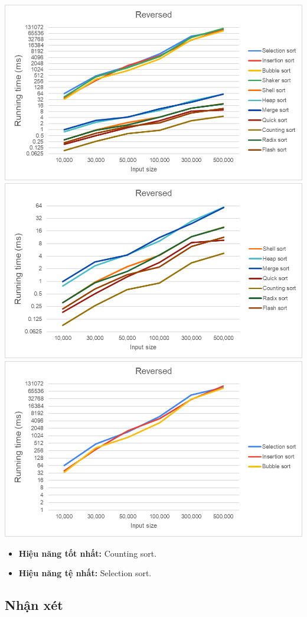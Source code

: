     \includegraphics[width = 1\linewidth]{img/experiment/running time/reversed/1.png}
    \includegraphics[width = 1\linewidth]{img/experiment/running time/reversed/2.png}
    \includegraphics[width = 1\linewidth]{img/experiment/running time/reversed/3.png}

    \begin{itemize}
        \item \textbf{Hiệu năng tốt nhất:} Counting sort.
        \item \textbf{Hiệu năng tệ nhất:} Selection sort. 
    \end{itemize}


\newpage
\subsection{Nhận xét}